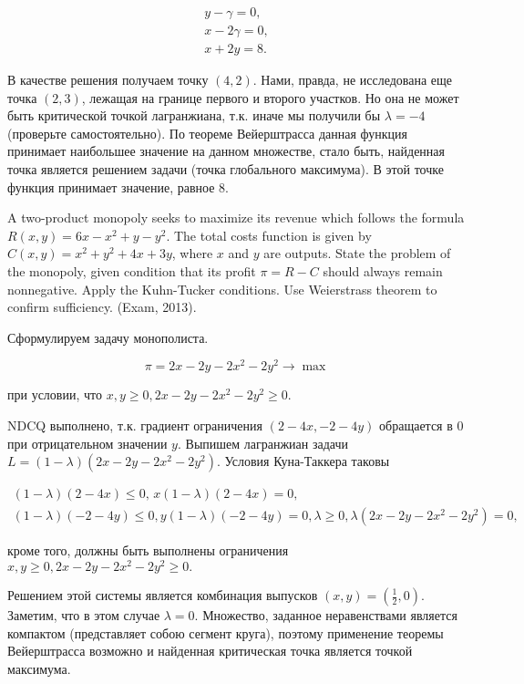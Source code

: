 \begin{solution}
\[\begin{array}{l} {y-\gamma =0,} \\ {x-2\gamma =0,} \\ {x+2y=8.} \end{array}\] 

В качестве решения получаем точку $(4,2)$. Нами, правда, не исследована еще точка $(2,3)$, лежащая на границе первого и второго участков. Но она не может быть критической точкой лагранжиана, т.к. иначе мы получили бы $\lambda =-4$ (проверьте самостоятельно). По теореме Вейерштрасса данная функция принимает наибольшее значение на данном множестве, стало быть, найденная точка является решением задачи (точка глобального максимума). В этой точке функция принимает значение, равное 8.
\end{solution}

\begin{problem} 
A two-product monopoly seeks to maximize its revenue which follows the formula $R(x,y)=6x-x^{2} +y-y^{2} $. The total costs function is given by $C(x,y)=x^{2} +y^{2} +4x+3y$, where $x$ and $y$ are outputs. State the problem of the monopoly, given condition that its profit $\pi =R-C$ should always remain nonnegative. Apply the Kuhn-Tucker conditions. Use Weierstrass theorem to confirm sufficiency. (Exam, 2013).
\end{problem}

\begin{solution}
Сформулируем задачу монополиста.

\[\pi =2x-2y-2x^{2} -2y^{2} \to \max \] 

при условии, что $x,y\ge 0,  2x-2y-2x^{2} -2y^{2} \ge 0.$

NDCQ выполнено, т.к. градиент ограничения $(2-4x,-2-4y)$ обращается в 0 при отрицательном значении $y$. Выпишем лагранжиан задачи $L=(1-\lambda )(2x-2y-2x^{2} -2y^{2} )$. Условия Куна-Таккера таковы

\[\begin{array}{l} {(1-\lambda )(2-4x)\le 0,\, x(1-\lambda )(2-4x)=0,} \\ {(1-\lambda )(-2-4y)\le 0,  y(1-\lambda )(-2-4y)=0,  \lambda \ge 0,  \lambda (2x-2y-2x^{2} -2y^{2} )=0,} \end{array}\] 

кроме того, должны быть выполнены ограничения $x,y\ge 0,  2x-2y-2x^{2} -2y^{2} \ge 0.$

Решением этой системы является комбинация выпусков $(x,y)=(\frac{1}{2} ,0)$. Заметим, что в этом случае $\lambda =0$. Множество, заданное неравенствами является компактом (представляет собою сегмент круга), поэтому применение теоремы Вейерштрасса возможно и найденная критическая точка является точкой максимума.
\end{solution}

